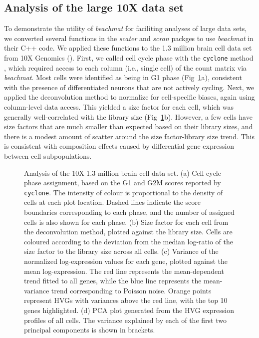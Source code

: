 \documentclass[10pt,letterpaper]{article}
\newcommand{\beachmat}{\textit{beachmat}}
\newcommand{\code}[1]{\texttt{#1}}
\begin{document}
\subsection*{Analysis of the large 10X data set}
To demonstrate the utility of \beachmat{} for faciliting analyses of large data sets, we converted several functions in the \textit{scater} \cite{mccarthy2017scater} and \textit{scran} packges \cite{lun2016stepbystep} to use \beachmat{} in their C++ code.
We applied these functions to the 1.3 million brain cell data set from 10X Genomics (\suppsecrealtenx{}).
First, we called cell cycle phase with the \code{cyclone} method \cite{scialdone2015computational}, which required access to each column (i.e., single cell) of the count matrix via \beachmat{}. 
Most cells were identified as being in G1 phase (Fig~\ref{fig:tenx}a), consistent with the presence of differentiated neurons that are not actively cycling.
Next, we applied the deconvolution method \cite{lun2016pooling} to normalize for cell-specific biases, again using column-level data access.
This yielded a size factor for each cell, which was generally well-correlated with the library size (Fig~\ref{fig:tenx}b).
However, a few cells have size factors that are much smaller than expected based on their library sizes, and there is a modest amount of scatter around the size factor-library size trend.
This is consistent with composition effects \cite{robinson2010scaling} caused by differential gene expression between cell subpopulations.

\begin{figure}[b]
    \caption{Analysis of the 10X 1.3 million brain cell data set.
        (a) Cell cycle phase assignment, based on the G1 and G2M scores reported by \code{cyclone}.
        The intensity of colour is proportional to the density of cells at each plot location.
        Dashed lines indicate the score boundaries corresponding to each phase, and the number of assigned cells is also shown for each phase.
        (b) Size factor for each cell from the deconvolution method, plotted against the library size.
        Cells are coloured according to the deviation from the median log-ratio of the size factor to the library size across all cells.
        (c) Variance of the normalized log-expression values for each gene, plotted against the mean log-expression.
        The red line represents the mean-dependent trend fitted to all genes, while the blue line represents the mean-variance trend corresponding to Poisson noise.
        Orange points represent HVGs with variances above the red line, with the top 10 genes highlighted.
        (d) PCA plot generated from the HVG expression profiles of all cells.
        The variance explained by each of the first two principal components is shown in brackets.
    }
    \label{fig:tenx}
\end{figure}
\end{document}
